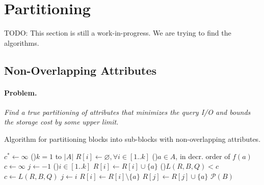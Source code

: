 \documentclass[twocolumn]{svjour3}          %
\let\emptyset\varnothing
\begin{document}
\section{Partitioning}

TODO: This section is still a work-in-progress. We are trying to find the algorithms.


\subsection{Non-Overlapping Attributes}

\paragraph*{Problem.}\emph{Find a true partitioning of attributes that minimizes
  the query I/O and bounds the storage cost by some upper limit.}


\begin{algorithm}[h]
\scriptsize
\caption{Algorithm for partitioning blocks into sub-blocks with non-overlapping attributes.}
\label{alg:overlappingP}
$c^*\leftarrow \infty$ 
\For(){$k=1$ to $|A|$}{
   $R[i]\leftarrow \emptyset, \forall i\in [1..k]$ 
   \For(){$a \in A$\textnormal{, in decr.\/ order of }$f(a)$}{
      $c\leftarrow \infty$   
      $j\leftarrow -1$ 
      \For(){$i\in [1..k]$} {
         $R[i]\leftarrow R[i] \cup \{a\}$
         \If(){$L(R, B, Q)<c$}{
            $c\leftarrow L(R, B, Q)$
            $j\leftarrow i$
         }
         $R[i]\leftarrow R[i] \setminus \{a\}$
      }
      $R[j]\leftarrow R[j] \cup \{a\}$
   }
}
\Return $\mathcal{P}(B)$ 
\end{algorithm} 
\end{document}
